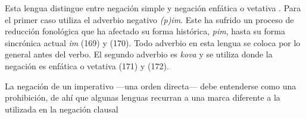 Esta lengua distingue entre negación simple y negación enfática o vetativa \textcolor{MidnightBlue}{\citep{pimbajo}}. Para el primer caso utiliza el adverbio negativo {\setmainfont{Charis SIL} \textit{(p)im}}. Este ha sufrido un proceso de reducción fonológica que ha afectado su forma histórica, {\setmainfont{Charis SIL} \textit{pim}}, hasta su forma sincrónica actual {\setmainfont{Charis SIL} \textit{im}} (169) y (170). Todo adverbio en esta lengua se coloca por lo general antes del verbo. El segundo adverbio es {\setmainfont{Charis SIL} \textit{kova}} y se utiliza donde la negación es enfática o vetativa (171) y (172).

La negación de un imperativo —una orden directa— debe entenderse como una prohibición, de ahí que algunas lenguas recurran a una marca diferente a la utilizada en la negación clausal